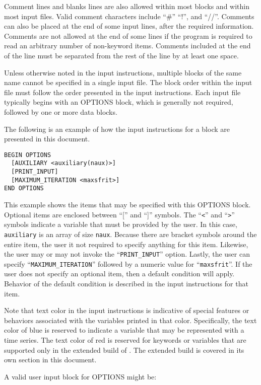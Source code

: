 Comment lines and blanks lines are also allowed within most blocks and within most input files.  Valid comment characters include ``\#'' ``!'', and ``//''.  Comments can also be placed at the end of some input lines, after the required information.  Comments are not allowed at the end of some lines if the program is required to read an arbitrary number of non-keyword items.  Comments included at the end of the line must be separated from the rest of the line by at least one space.

Unless otherwise noted in the input instructions, multiple blocks of the same name cannot be specified in a single input file.  The block order within the input file must follow the order presented in the input instructions.  Each input file typically begins with an OPTIONS block, which is generally not required, followed by one or more data blocks.

The following is an example of how the input instructions for a block are presented in this document.  
\begin{lstlisting}[style=blockdefinition]
BEGIN OPTIONS
  [AUXILIARY <auxiliary(naux)>]
  [PRINT_INPUT]
  [MAXIMUM_ITERATION <maxsfrit>]
END OPTIONS
\end{lstlisting}
This example shows the items that may be specified with this OPTIONS block.  Optional items are enclosed between ``['' and ``]'' symbols.  The ``\texttt{<}'' and ``\texttt{>}'' symbols indicate a variable that must be provided by the user.  In this case, \texttt{auxiliary} is an array of size \texttt{naux}.  Because there are bracket symbols around the entire item, the user it not required to specify anything for this item.  Likewise, the user may or may not invoke the ``\texttt{PRINT\_INPUT}'' option.  Lastly, the user can specify ``\texttt{MAXIMUM\_ITERATION}'' followed by a numeric value for ``\texttt{maxsfrit}''.  If the user does not specify an optional item, then a default condition will apply.  Behavior of the default condition is described in the input instructions for that item.

Note that text color in the input instructions is indicative of special features or behaviors associated with the variables printed in that color.  Specifically, the text color of blue is reserved to indicate a variable that may be represented with a time series.  The text color of red is reserved for keywords or variables that are supported only in the extended build of \mf.  The extended build is covered in its own section in this document.

\vspace{6pt}\noindent A valid user input block for OPTIONS might be:

